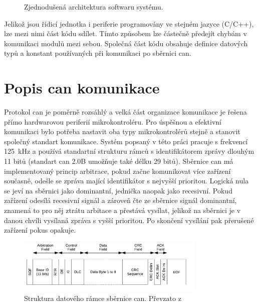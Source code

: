 \begin{figure}[h!]
        
        \caption{Zjednodušená architektura softwaru systému.}
        \label{fig:sw-blokove-schema}
    \end{figure}

    Jelikož jsou řídicí jednotka i periferie programovány ve stejném jazyce (C/C++), lze mezi nimi část kódu sdílet. Tímto způsobem lze částečně předejít chybám v komunikaci modulů mezi sebou. Společná část kódu obsahuje definice datových typů a konstant používaných při komunikaci po sběrnici \acs{can}.  

\section{Popis \acs{can} komunikace}
    Protokol \acs{can} je poměrně rozsáhlý a velká část organizace komunikace je řešena přímo hardwarovou periferií mikrokontroléru. Pro úspěšnou a efektivní komunikaci bylo potřeba nastavit oba typy mikrokontrolérů stejně a stanovit společný standart komunikace. Systém popsaný v této práci pracuje s frekvencí \qty{125}{kHz} a používá standartní strukturu rámců s identifikátorem zprávy dlouhým 11 bitů (standart \acs{can} 2.0B umožňuje také délku 29 bitů). Sběrnice \acs{can} má implementovaný princip arbitrace, pokud začne komunikovat více zařízení současně, odešle se zpráva mající identifikátor s nejvyšší prioritou. Logická nula se jeví na sběrnici jako dominantní, jednička naopak jako recesivní. Pokud zařízení odesílá recesivní signál a zároveň čte ze sběrnice signál dominantní, znamená to pro něj ztrátu arbitace a přestává vysílat, jelikož na sběrnici je v danou chvíli vysílaná zpráva s vyšší prioritou. Po skončení vysílání pak přerušené zařízení pokus opakuje.
    
        \begin{figure}[h!]
            \centering
            \includegraphics[width=0.8\textwidth]{obrazky/can-frame.png}
            \caption{Struktura datového rámce sběrnice \acs{can}. Převzato z~\cite{esp32-datasheet}}
            \label{fig:obrazky/can-frame.png   }
        \end{figure}
        

